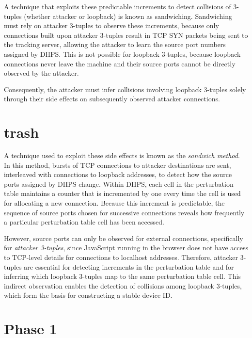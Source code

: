 \documentclass{report}
\begin{document}
A technique that exploits these predictable increments to detect collisions of 3-tuples (whether attacker or loopback) is known as \alert{sandwiching}. Sandwiching must rely on \alert{attacker 3-tuples} to observe these increments, because only connections built upon attacker 3-tuples result in TCP SYN packets being sent to the tracking server, allowing the attacker to learn the source port numbers assigned by DHPS. This is not possible for \alert{loopback 3-tuples}, because loopback connections never leave the machine and their source ports cannot be directly observed by the attacker.

Consequently, the attacker must infer collisions involving loopback 3-tuples solely through their side effects on subsequently observed attacker connections.


\section{trash}
\label{sec:trash}

A technique used to exploit these side effects is known as the \emph{sandwich method}. In this method, bursts of TCP connections to attacker destinations are sent, interleaved with connections to loopback addresses, to detect how the source ports assigned by DHPS change. Within DHPS, each cell in the perturbation table maintains a counter that is incremented by one every time the cell is used for allocating a new connection. Because this increment is predictable, the sequence of source ports chosen for successive connections reveals how frequently a particular perturbation table cell has been accessed.

However, source ports can only be observed for external connections, specifically for \emph{attacker 3-tuples}, since JavaScript running in the browser does not have access to TCP-level details for connections to localhost addresses. Therefore, attacker 3-tuples are essential for detecting increments in the perturbation table and for inferring which loopback 3-tuples map to the same perturbation table cell. This indirect observation enables the detection of collisions among loopback 3-tuples, which form the basis for constructing a stable device ID.

\section{Phase 1}
\label{sec:phase 1}

\end{document}
